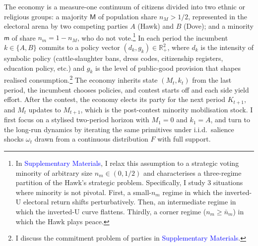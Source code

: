\documentclass[11pt,twoside]{extarticle}
\newcommand{\suppmat}{\textcolor{blue}{Supplementary Materials}}
\begin{document}
The economy is a measure-one continuum of citizens divided into two ethnic or religious groups: a majority $\mathsf M$ of population share $n_M>1/2$, represented in the electoral arena by two competing parties $A$ (Hawk) and $B$ (Dove); and a minority $\mathsf m$ of share $n_m=1-n_M$, who do not vote.\footnote{In \suppmat, I relax this assumption to a strategic voting minority of arbitrary size $n_m\in(0,1/2)$ and characterises a three-regime partition of the Hawk's strategic problem. Specifically, I study 3 situations where minority is not pivotal. First, a small-$n_m$ regime in which the inverted-U electoral return shifts perturbatively. Then, an intermediate regime in which the inverted-U curve flattens. Thirdly, a corner regime ($n_m\ge\bar n_m$) in which the Hawk plays peace.} In each period the incumbent $k\in\{A,B\}$ commits to a policy vector $(d_k,g_k)\in\mathbb R_+^2$, where $d_k$ is the intensity of symbolic policy (cattle-slaughter bans, dress codes, citizenship registers, education policy, etc.) and $g_k$ is the level of public-good provision that shapes realised consumption.\footnote{I discuss the commitment problem of parties in \suppmat.} 
The economy inherits state $(M_t,k_t)$ from the last period, the incumbent chooses policies, and contest starts off and each side yield effort. After the contest, the economy elects its party for the next period $K_{t+1}$, and $M_t$ updates to $M_{t+1}$, which is the post-contest minority mobilisation stock.
I first focus on a stylised two-period horizon with $M_1=0$ and $k_1=A$, and turn to the long-run dynamics by iterating the same primitives under i.i.d.\ salience shocks $\omega_t$ drawn from a continuous distribution $F$ with full support.
\end{document}
